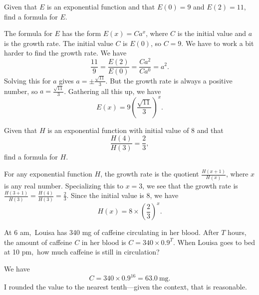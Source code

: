 \documentclass[12pt,fleqn,answers]{exam}
\newcommand\AM{{\sc am}}
\newcommand\PM{{\sc pm}}
\begin{document}
\begin{questions} 

\question [2] Given that $E$ is an exponential function and that $E(0)=9$
and $E(2) = 11$, find a formula for $E$.

\begin{solution}[2.5in] The formula for $E$ has the form $E(x) = C a^x$,
    where $C$ is the initial value and $a$ is the growth rate. The 
    initial value $C$ is $E(0)$, so $C = 9.$ We have to work a bit 
    harder to find the growth rate. We have
    \begin{equation*}
        \frac{11}{9} = \frac{E(2)}{E(0)} = \frac{C a^2}{C a^0} = a^2.
    \end{equation*}
    Solving this for $a$ gives $a = \pm \frac{\sqrt{11}}{3}$. But 
    the growth rate is always a positive number, so 
    $a = \frac{\sqrt{11}}{3}$. Gathering all this up, we have
    \begin{equation*}
        E(x) = 9 \left(  \frac{\sqrt{11}}{3} \right)^x.
    \end{equation*}

  \end{solution}

\question [2] Given that $H$ is an exponential function with
initial value of $8$ and that
\begin{equation*}
   \frac{H(4)}{H(3)} = \frac{2}{3},
\end{equation*}
find a formula for $H$.
\begin{solution}%
    For any exponential function $H$, the growth rate is the quotient
    $\frac{H(x+1)}{H(x)}$, where $x$ is any real number. Specializing this 
    to $x=3$, we see that the
    growth rate is $\frac{H(3+1)}{H(3)} =  \frac{H(4)}{H(3)} = \frac{2}{3}$. Since the initial value is $8$, we
    have
    \begin{equation*}
        H(x) = 8 \times \left(\frac{2}{3} \right)^x.
    \end{equation*}

\end{solution}
\vfill
\newpage

\question [2]  At 6 \AM,\, Louisa has 340 mg of caffeine circulating 
in her blood. After $T$ hours, the amount of caffeine $C$ in her blood is
\(
     C = 340  \times  0.9^T
\).
When Louisa goes to bed at 10 \PM,\, how much caffeine is
still in circulation?
\begin{solution}[1.5in] We have
    \begin{equation*}
        C = 340 \times 0.9^{16} = \SI{63.0}{\milli\gram}.
    \end{equation*}
I rounded the value to the nearest tenth---given the context, that
is reasonable.
\end{solution}


\end{questions}
\end{document}
